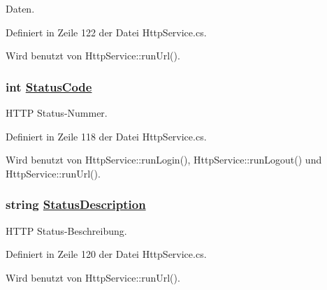 Daten. 



Definiert in Zeile 122 der Datei Http\-Service.cs.

Wird benutzt von Http\-Service::run\-Url().\hypertarget{classQbeSAS_1_1HttpService_1_1ForeignHttpResponse_QbeSAS_1_1HttpService_1_1ForeignHttpResponseo0}{
\subsubsection[StatusCode]{\setlength{\rightskip}{0pt plus 5cm}int \hyperlink{classQbeSAS_1_1HttpService_1_1ForeignHttpResponse_QbeSAS_1_1HttpService_1_1ForeignHttpResponseo0}{Status\-Code}}}
\label{classQbeSAS_1_1HttpService_1_1ForeignHttpResponse_QbeSAS_1_1HttpService_1_1ForeignHttpResponseo0}


HTTP Status-Nummer. 



Definiert in Zeile 118 der Datei Http\-Service.cs.

Wird benutzt von Http\-Service::run\-Login(), Http\-Service::run\-Logout() und Http\-Service::run\-Url().\hypertarget{classQbeSAS_1_1HttpService_1_1ForeignHttpResponse_QbeSAS_1_1HttpService_1_1ForeignHttpResponseo1}{
\subsubsection[StatusDescription]{\setlength{\rightskip}{0pt plus 5cm}string \hyperlink{classQbeSAS_1_1HttpService_1_1ForeignHttpResponse_QbeSAS_1_1HttpService_1_1ForeignHttpResponseo1}{Status\-Description}}}
\label{classQbeSAS_1_1HttpService_1_1ForeignHttpResponse_QbeSAS_1_1HttpService_1_1ForeignHttpResponseo1}


HTTP Status-Beschreibung. 



Definiert in Zeile 120 der Datei Http\-Service.cs.

Wird benutzt von Http\-Service::run\-Url().